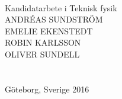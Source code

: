 

\begin{titlepage}
			
\addtolength{\voffset}{2cm}

\begin{figure}[h!]
\centering
\vspace{2cm}	%
\end{figure}

\mbox{}
\vfill
\renewcommand{\familydefault}{\sfdefault} \normalfont %

\begin{flushleft}
\textbf{{\Huge \titel }} 	\\[0.5cm]
{\Large \undertitel }       \setlength{\parskip}{0.5cm}

Kandidatarbete i Teknisk fysik \\[1cm]

{\Large 
ANDRÉAS SUNDSTRÖM \\
EMELIE EKENSTEDT \\
ROBIN KARLSSON \\
OLIVER SUNDELL
} 
\\[2.cm]

\institution \\
\textsc{\skola} \\
Göteborg, Sverige 2016
\end{flushleft}

\renewcommand{\familydefault}{\rmdefault} \normalfont %
\end{titlepage}


\newpage
\restoregeometry
\thispagestyle{empty}
\mbox{}


